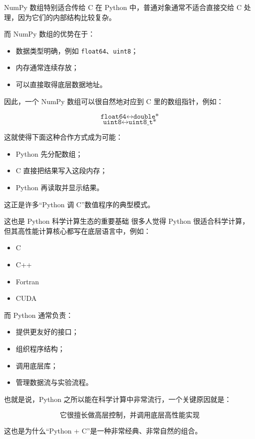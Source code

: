 \documentclass[aspectratio=169,11pt]{ctexbeamer}
\begin{document}
\begin{frame}[fragile]{NumPy 数组特别适合传给 C}
在 Python 中，普通对象通常不适合直接交给 C 处理，因为它们的内部结构比较复杂。

\vspace{0.5em}
而 NumPy 数组的优势在于：

\begin{itemize}
  \item 数据类型明确，例如 \texttt{float64}、\texttt{uint8}；
  \item 内存通常连续存放；
  \item 可以直接取得底层数据地址。
\end{itemize}

因此，一个 NumPy 数组可以很自然地对应到 C 里的数组指针，例如：

\[
\texttt{float64} \longleftrightarrow \texttt{double*}
\]
\[
\texttt{uint8} \longleftrightarrow \texttt{uint8\_t*}
\]

\vspace{0.5em}
这就使得下面这种合作方式成为可能：

\begin{itemize}
  \item Python 先分配数组；
  \item C 直接把结果写入这段内存；
  \item Python 再读取并显示结果。
\end{itemize}

这正是许多“Python 调 C”数值程序的典型模式。
\end{frame}

\begin{frame}[fragile]{这也是 Python 科学计算生态的重要基础}
很多人觉得 Python 很适合科学计算，但其高性能计算核心都写在底层语言中，例如：

\begin{itemize}
  \item C
  \item C++
  \item Fortran
  \item CUDA
\end{itemize}

而 Python 通常负责：

\begin{itemize}
  \item 提供更友好的接口；
  \item 组织程序结构；
  \item 调用底层库；
  \item 管理数据流与实验流程。
\end{itemize}

也就是说，Python 之所以能在科学计算中非常流行，一个关键原因就是：

\[
\boxed{
\text{它很擅长做高层控制，并调用底层高性能实现}
}
\]

这也是为什么“Python + C”是一种非常经典、非常自然的组合。
\end{frame}
\end{document}
